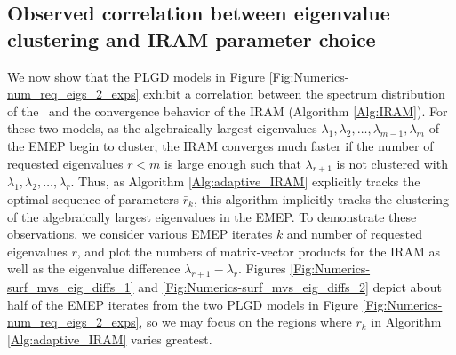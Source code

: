 \subsection{Observed correlation between eigenvalue clustering and IRAM parameter choice}		\label{Subsubsec:Numerics-correl_clustering_IRAM_param}




We now show that the PLGD models in Figure \ref{Fig:Numerics-num_req_eigs_2_exps} exhibit a correlation between the spectrum distribution of the \emep \ and the convergence behavior of the IRAM (Algorithm \ref{Alg:IRAM}).
For these two models, as the algebraically largest eigenvalues $\lambda_1, \lambda_2, \ldots, \lambda_{m-1}, \lambda_{m}$ of the EMEP begin to cluster, 
the IRAM converges much faster if the number of requested eigenvalues $r<m$ is large enough such that $\lambda_{r+1}$ is not clustered with $\lambda_1, \lambda_2, \ldots, \lambda_r$.
Thus, as Algorithm \ref{Alg:adaptive_IRAM} explicitly tracks the optimal sequence of parameters $\bar{r}_k$, this algorithm implicitly tracks the clustering of the algebraically largest eigenvalues in the EMEP.
To demonstrate these observations, we consider various EMEP iterates $k$ and number of requested eigenvalues $r$, and plot the numbers of matrix-vector products for the IRAM as well as the eigenvalue difference $\lambda_{r+1} - \lambda_r$.
Figures \ref{Fig:Numerics-surf_mvs_eig_diffs_1} and \ref{Fig:Numerics-surf_mvs_eig_diffs_2} depict about half of the EMEP iterates from the two PLGD models in Figure \ref{Fig:Numerics-num_req_eigs_2_exps}, so we may focus on the regions where $r_k$ in Algorithm \ref{Alg:adaptive_IRAM} varies greatest.






